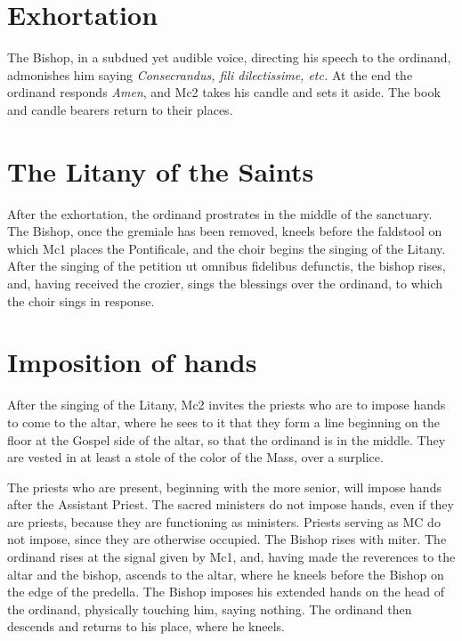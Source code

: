 \documentclass{report}
\begin{document}
{	\section{Exhortation}

	\rubric The Bishop, in a subdued yet audible voice, directing his speech to
	the ordinand, admonishes him saying \textit{Consecrandus, fili
	dilectissime, etc.} At the end the ordinand responds \textit{Amen}, and Mc2
	takes his candle and sets it aside. The book and candle bearers return to
	their places.

	\section{The Litany of the Saints}

	After the exhortation, the ordinand prostrates in the middle of the
	sanctuary. The Bishop, once the gremiale has been removed, kneels before
	the faldstool on which Mc1 places the Pontificale, and the choir begins the
	singing of the Litany. After the singing of the petition ut omnibus
	fidelibus defunctis, the bishop rises, and, having received the crozier,
	sings the blessings over the ordinand, to which the choir sings in
	response.

	\section{Imposition of hands}

	After the singing of the Litany, Mc2 invites the priests who are to impose
	hands to come to the altar, where he sees to it that they form a line
	beginning on the floor at the Gospel side of the altar, so that the
	ordinand is in the middle. They are vested in at least a stole of the color
	of the Mass, over a surplice.

	The priests who are present, beginning with the more senior, will impose
	hands after the Assistant Priest. The sacred ministers do not impose hands,
	even if they are priests, because they are functioning as ministers.
	Priests serving as MC do not impose, since they are otherwise occupied. The
	Bishop rises with miter. The ordinand rises at the signal given by Mc1,
	and, having made the reverences to the altar and the bishop, ascends to the
	altar, where he kneels before the Bishop on the edge of the predella. The
	Bishop imposes his extended hands on the head of the ordinand, physically
	touching him, saying nothing. The ordinand then descends and returns to his
	place, where he kneels.

}
\end{document}
